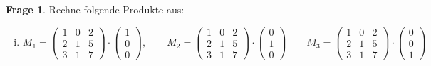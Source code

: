 \documentclass{scrartcl}
\theoremstyle{definition}
\newtheorem{frage}{Frage}[section]
\begin{document}
\begin{frage}
Rechne folgende Produkte aus:
\begin{enumerate}[(i)]
\item \[
M_1 = 
\begin{pmatrix}
  1  & 0 & 2 \\
  2  & 1 & 5 \\
  3  & 1 & 7
\end{pmatrix} \cdot \begin{pmatrix}
  1 \\ 0 \\ 0
\end{pmatrix}, \qquad M_2 =
\begin{pmatrix}
  1  & 0 & 2 \\
  2  & 1 & 5 \\
  3  & 1 & 7
\end{pmatrix} \cdot \begin{pmatrix}
  0 \\ 1 \\ 0
\end{pmatrix} \qquad M_3 =
\begin{pmatrix}
  1  & 0 & 2 \\
  2  & 1 & 5 \\
  3  & 1 & 7
\end{pmatrix} \cdot \begin{pmatrix}
  0 \\ 0 \\ 1
\end{pmatrix}
\]


\end{enumerate}
\end{frage}
\end{document}
